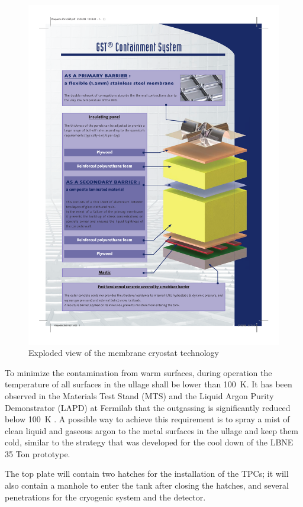 \begin{figure}[htbp]
\begin{center}
\includegraphics[width=.9\textwidth]{figures/membrane-exploded-view}
\caption[Exploded view of the membrane cryostat technology]{ Exploded view of the membrane cryostat technology}
\label{fig:lar-org}
\end{center}
\end{figure}

To minimize the contamination from warm surfaces, during operation the temperature of all surfaces in the ullage shall be lower than 100~K. 
It has been observed in the Materials Test Stand (MTS) and the Liquid Argon Purity Demonstrator (LAPD) at Fermilab that the outgassing is significantly reduced below 100~K \cite{outgassing}. A possible way to achieve this requirement is to spray a mist of clean liquid and gaseous argon to the metal surfaces in the ullage and keep them cold, similar to the strategy that was developed for the cool down of the LBNE 35 Ton prototype.

The top plate will contain two hatches for the installation of the TPCs; it will also contain a manhole to enter the tank after closing the hatches, and several penetrations for the cryogenic system and the detector. 

